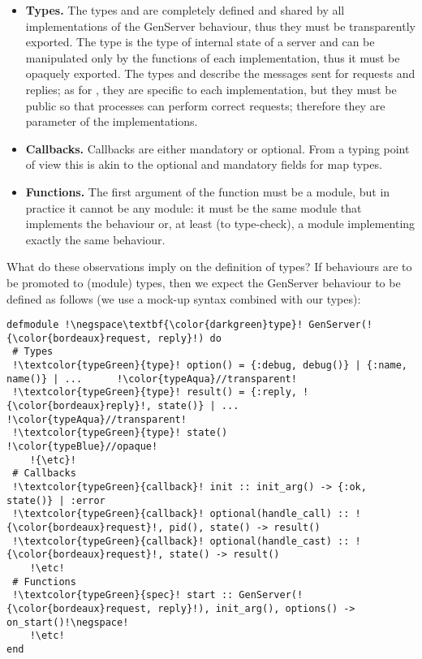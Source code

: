 \documentclass[a4paper,10pt]{article}
\begin{document}
\begin{itemize}
  \item \textbf{Types.} The types  and  are completely defined and  shared by all implementations of the GenServer behaviour, thus they must be transparently exported. The type  is the type of internal state of a server and can be manipulated only by the functions of each implementation, thus it must be opaquely exported. The types  and  describe the messages sent for requests and replies; as for , they are specific to each implementation, but they must be public so that processes can perform correct requests; therefore they are parameter of the implementations.

  \item \textbf{Callbacks.} Callbacks are either mandatory or optional. From a typing point of view this is akin to the optional and mandatory fields for map types.

  \item \textbf{Functions.} The first argument of the  function must be a module, but in practice it cannot be any module: it must be the same module that implements the behaviour or, at least (to type-check), a module implementing exactly the same behaviour.
\end{itemize}
What do these observations imply on the definition of types? If
behaviours are to be promoted to (module) types, then we expect the
GenServer behaviour to be defined as follows (we use a mock-up syntax
combined with our types):
\begin{verbatim}
defmodule !\negspace\textbf{\color{darkgreen}type}! GenServer(!{\color{bordeaux}request, reply}!) do
 # Types
 !\textcolor{typeGreen}{type}! option() = {:debug, debug()} | {:name, name()} | ...      !\color{typeAqua}//transparent!
 !\textcolor{typeGreen}{type}! result() = {:reply, !{\color{bordeaux}reply}!, state()} | ...                 !\color{typeAqua}//transparent!
 !\textcolor{typeGreen}{type}! state()                                                   !\color{typeBlue}//opaque!
    !{\etc}!
 # Callbacks
 !\textcolor{typeGreen}{callback}! init :: init_arg() -> {:ok, state()} | :error      
 !\textcolor{typeGreen}{callback}! optional(handle_call) :: !{\color{bordeaux}request}!, pid(), state() -> result() 
 !\textcolor{typeGreen}{callback}! optional(handle_cast) :: !{\color{bordeaux}request}!, state() -> result()        
    !\etc!
 # Functions
 !\textcolor{typeGreen}{spec}! start :: GenServer(!{\color{bordeaux}request, reply}!), init_arg(), options() -> on_start()!\negspace!
    !\etc!
end
\end{verbatim}
\end{document}
